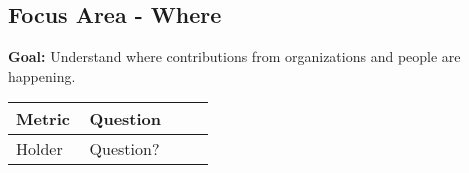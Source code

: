 
\subsection{Focus Area - Where}
\textbf{Goal:} Understand where contributions from organizations and people are happening.
\begin{table}[ht]
	\centering
	\begin{tabular}{| p{0.35\linewidth} | p{0.6\linewidth}|}
			\hline
			\hfil \textbf{Metric} & \hfil \textbf{Question} \\ 
			\hline
			Holder & Question? \\
			\hline
	\end{tabular}
\end{table}

